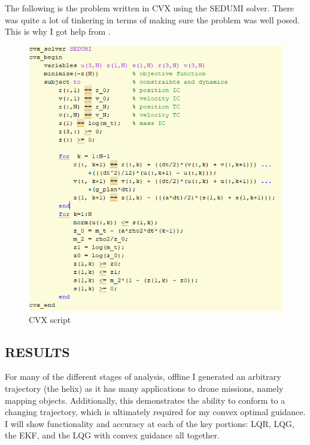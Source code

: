 \documentclass[conf]{new-aiaa}
\begin{document}
\begin{doublespace}
The following is the problem written in CVX using the SEDUMI solver. There was quite a lot of tinkering in terms of making sure the problem was well posed. This is why I got help from \citep{ploen2007}.
\begin{figure}[!htpb]
\centering
  \includegraphics[scale= 0.6]{CVX.png}
  \caption{CVX script}
  \label{CVX}
\end{figure}
\clearpage


% 
% 

\begin{singlespace}
\section{RESULTS}
For many of the different stages of analysis, offline I generated an arbitrary trajectory (the helix) as it has many applications to drone missions, namely mapping objects. Additionally, this demonstrates the ability to conform to a changing trajectory, which is ultimately required for my convex optimal guidance. I will show functionality and accuracy at each of the key portions: LQR, LQG, the EKF, and the LQG with convex guidance all together.


\end{singlespace}
\end{doublespace}
\end{document}
